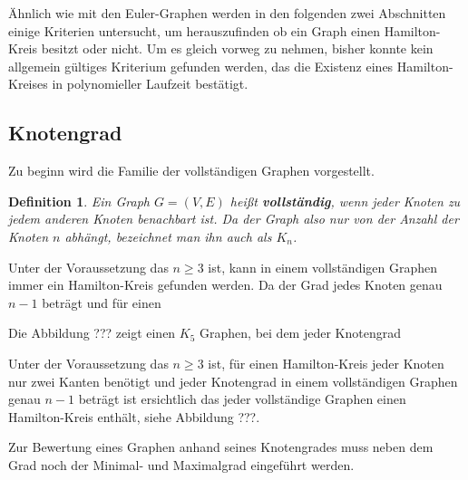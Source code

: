 \documentclass{article}
\newtheorem{mydef}{Definition}
\begin{document}
Ähnlich wie mit den Euler-Graphen werden in den folgenden zwei Abschnitten einige Kriterien untersucht, um herauszufinden ob ein Graph einen Hamilton-Kreis besitzt oder nicht. Um es gleich vorweg zu nehmen, bisher konnte kein allgemein gültiges Kriterium gefunden werden, das die Existenz eines Hamilton-Kreises in polynomieller Laufzeit bestätigt.

%
%
\subsection{Knotengrad}

Zu beginn wird die Familie der vollständigen Graphen vorgestellt.

\begin{mydef}
	Ein Graph $G=(V,E)$ heißt \textbf{vollständig}, wenn jeder Knoten zu jedem anderen Knoten benachbart ist. Da der Graph also nur von der Anzahl der Knoten $n$ abhängt, bezeichnet man ihn auch als $K_n$. \cite{busing2010graphen}
\end{mydef}

Unter der Voraussetzung das $n \geq 3$ ist, kann in einem vollständigen Graphen immer ein Hamilton-Kreis gefunden werden. Da der Grad jedes Knoten genau $n-1$ beträgt und für einen 

Die Abbildung ??? zeigt einen $K_5$ Graphen, bei dem jeder Knotengrad 

Unter der Voraussetzung das $n \geq 3$ ist, für einen Hamilton-Kreis jeder Knoten nur zwei Kanten benötigt und jeder Knotengrad in einem vollständigen Graphen genau $n-1$ beträgt ist ersichtlich das jeder vollständige Graphen einen Hamilton-Kreis enthält, siehe Abbildung ???.

\begin{figure}[h]
	\centering
	\caption{}
	\label{fig:pentagon_graph}
\end{figure}

Zur Bewertung eines Graphen anhand seines Knotengrades muss neben dem Grad noch der Minimal- und Maximalgrad eingeführt werden.
\end{document}

